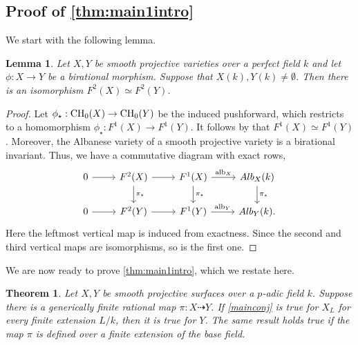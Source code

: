 \documentclass[12pt]{amsart}
\newtheorem{theo}[theo]{Theorem}
\newtheorem{lem}[lem]{Lemma}
\theoremstyle{remark}
\renewcommand{\1}{{\mathbb{S}}}
\newcommand{\alb}{{\rm alb}}
\newcommand{\CH}{{\rm CH}}
\newcommand{\<}{\langle}
\renewcommand{\>}{\rangle}
\begin{document}
\subsection{Proof of \autoref{thm:main1intro}}\label{sec:CTconj}
 We start with the following lemma. 

\begin{lem} Let $X, Y$ be smooth projective varieties over a perfect field $k$ and let $\phi:X\to Y$ be a birational morphism. Suppose that $X(k), Y(k)\neq\emptyset$. Then there is an isomorphism $F^2(X)\simeq F^2(Y)$. 
\end{lem}
\begin{proof}
Let $\phi_\star:\CH_0(X)\to \CH_0(Y)$ be the induced pushforward, which restricts to a homomorphism $\phi_\star:F^1(X)\to F^1(Y)$. It follows by \cite[Proposition 6.3]{CT3} that $F^1(X)\simeq F^1(Y)$. Moreover, the Albanese variety of a smooth projective variety is a birational invariant. Thus, we have a commutative diagram with exact rows,
\[
\begin{tikzcd} 0\arrow[r] & F^2(X) \arrow[r] \arrow[d, "\pi_\star"] &
	  F^{1}(X) \arrow[r, "\alb_X"] \arrow[d, "\pi_\star"] & Alb_{X}(k) \arrow[d, "\pi_\star"] \\
	     0\arrow[r] & F^2(Y) \arrow[r] &   F^1(Y)  \arrow[r, "\alb_Y"]                & Alb_{Y}(k) .
\end{tikzcd} 
\] 
Here the leftmost vertical map is induced from exactness. 
Since the second and third vertical maps are isomorphisms, so is the first one. 
    
\end{proof}

We are now ready to prove \autoref{thm:main1intro}, which we restate here. 

\begin{theo}\label{thm:main1} Let $X, Y$ be smooth projective surfaces over a $p$-adic field $k$. Suppose there is a generically finite rational map $\pi: X\dashrightarrow Y$. If \autoref{mainconj} is true for $X_L$ for every finite extension $L/k$, then it is true for $Y$.  The same result holds true if the map $\pi$ is defined over a finite extension of the base field. 
\end{theo}
\end{document}
